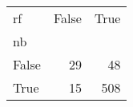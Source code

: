 \begin{tabular}{lrr}
\toprule
rf &  False &  True  \\
nb    &        &        \\
\midrule
False &     29 &     48 \\
True  &     15 &    508 \\
\bottomrule
\end{tabular}
